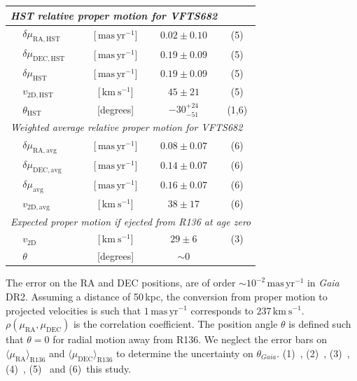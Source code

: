 \documentclass[a4paper,fleqn,usenatbib]{mnras}
\newcommand{\SdM}[1]{{{\color{brown}{#1}}}}
\newcommand{\kms}{{\,\mathrm{km\ s^{-1}}}}
\newcommand{\masyr}{\,\mathrm{mas}\,\mathrm{yr}^{-1}}
\begin{document}
\begin{table}
\begin{center}
\begin{tabular}{llc|c|c}
 \hline     
      \multicolumn{5}{l}{\emph{HST relative proper motion for VFTS682}} \\
            \hline
      &$\delta\mu_\mathrm{RA, HST}$  &[$\masyr$] & $0.02\pm0.10$ & (5) \\
      &$\delta\mu_\mathrm{DEC, HST}$  &[$\masyr$] & $0.19\pm0.09$ &  (5) \\
       &$\delta\mu_\mathrm{HST}$  &[$\masyr$] & $0.19\pm0.09$ &  (5) \\
                  &$v_\mathrm{2D, HST}$  &[$\kms$] & $45\pm21$ & (5)\\  
                      &$\theta_\mathrm{HST}$  &[degrees] &   $-30_{-51}^{+24}$   & (1,6)\\  
      \hline
      \multicolumn{5}{l}{\emph{Weighted average relative proper motion
      for VFTS682}}\\
      \hline
      &$\delta\mu_\mathrm{RA, avg}$  &[$\masyr$] & $0.08\pm0.07$ & (6) \\
      &$\delta\mu_\mathrm{DEC, avg}$  &[$\masyr$] & $0.14\pm0.07$ &  (6) \\
       &$\delta\mu_\mathrm{avg}$  &[$\masyr$] & $0.16\pm0.07$ &  (6) \\
      &$v_\mathrm{2D, avg}$  &[$\kms$] & $38\pm17$ & (6)\\
      \hline
       \multicolumn{5}{l}{\emph{Expected proper motion if ejected from
      R136 at age zero}} \\
      \hline
      &$v_\mathrm{2D}$  &[$\kms$] & $29\pm 6$ & (3) \\  
      &$\theta$  &[degrees] &  $\sim0$  & \\ 
       \hline
    \end{tabular}
    {\tiny The error on the RA and DEC positions, are of order
      $\sim$$10^{-2}\masyr$ in \emph{Gaia}
      DR2. Assuming a distance of 50\,kpc, the conversion from proper motion
    to projected velocities is such that $1\masyr$ corresponds to $237\kms$.
$\rho(\mu_\mathrm{RA},\mu_\mathrm{DEC})$ is the
      correlation coefficient. The position angle
      $\theta$ is defined such that $\theta=0$ for radial motion
      away from R136. We neglect the error bars on
      $\langle\mu_\mathrm{RA}\rangle_\mathrm{R136}$ and $\langle\mu_\mathrm{DEC}\rangle_\mathrm{R136}$ to determine the uncertainty
      on $\theta_{Gaia}$.
      (1)~\cite{brown:18},
      (2)~\cite{henault-brunet:12},
      (3)~\cite{bestenlehner:11},
      (4)~\cite{lennon:18}, 
      (5)~\cite{platais:18} and
      (6)~{\color{blue}this study}.
    }
  \end{center}
  \label{tab:vfts682}
\end{table}
\end{document}
